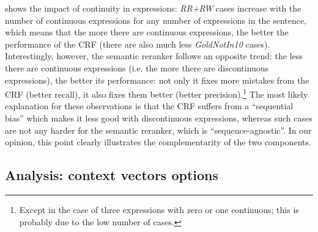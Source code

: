 \documentclass[output=paper
,modfonts
,nonflat]{langsci/langscibook}
\begin{document}
 shows the impact of continuity in
expressions: {\em RR+RW} cases increase with the number of continuous
expressions for any number of expressions in the sentence, which means that the more
there are continuous expressions, the better the performance of the
CRF (there are also much less {\em GoldNotIn10} cases). Interestingly,
however, the semantic reranker follows an opposite trend: the less
there are continuous expressions (i.e. the more there are
discontinuous expressions), the better its performance: not only it
fixes more mistakes from the CRF (better recall), it also fixes them
better (better precision).\footnote{Except in the case of three
  expressions with zero or one continuous; this is probably due to the
  low number of cases.} The most likely explanation for these
observations is that the CRF suffers from a ``sequential bias'' which
makes it less good with discontinuous expressions, whereas such cases
are not any harder for the semantic reranker, which is
``sequence-agnostic''. In our opinion, this point clearly illustrates
the complementarity of the two components.



\subsection{Analysis: context vectors options}
\label{analysisContextOptions}
\end{document}
